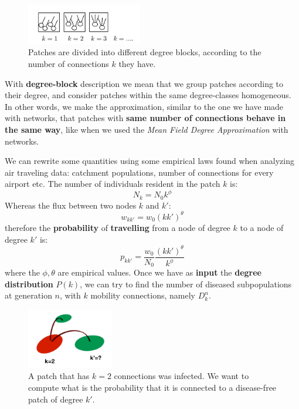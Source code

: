 \documentclass[../main/main.tex]{subfiles}
\begin{document}
\begin{figure}[h!]
\centering
\includegraphics[width=0.45\textwidth]{../lessons/image/16/image04.png}
\caption{\label{fig:16_04} Patches are divided into different degree blocks, according to the number of connections $k$ they have.}
\end{figure}

With \textbf{degree-block} description we mean that we group patches according to their degree, and consider patches within the same degree-classes homogeneous. In other words, we make the approximation, similar to the one we have made with networks, that patches with \textbf{same number of connections behave in the same way}, like when we used the \textit{Mean Field Degree Approximation} with networks.

We can rewrite some quantities using some empirical laws found when analyzing air traveling data: catchment populations, number of connections for every airport etc. The number of individuals resident in the patch $k$ is:
\begin{equation*}
    N_k = N_0 k^\phi
\end{equation*}
Whereas the flux between two nodes $k$ and $k'$:
\begin{equation*}
    w_{kk'} = w_0 (k k')^\theta
\end{equation*}
therefore the \textbf{probability} of \textbf{travelling} from a node of degree $k$ to a node of degree $k'$ is:
\begin{equation}
    p_{kk'} = \frac{w_0}{N_0}\frac{(k k')^\theta}{k^\phi}
\end{equation}
where the $\phi, \theta$ are empirical values. Once we have as \textbf{input} the \textbf{degree distribution} $P(k)$, we can try to find the number of diseased subpopulations at generation $n$, with $k$ mobility connections, namely $D_k^n$.

\begin{figure}[h!]
\centering
\includegraphics[width=0.34\textwidth]{../lessons/image/16/image05.png}
\caption{\label{fig:16_05} A patch that has $k=2$ connections was infected. We want to compute what is the probability that it is connected to a disease-free patch of degree $k'$.}
\end{figure}
\end{document}
